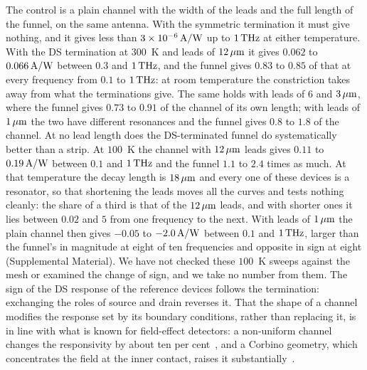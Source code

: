 The control is a plain channel with the width of the leads and the full
length of the funnel, on the same antenna. With the symmetric termination
it must give nothing, and it gives less than $3\times10^{-6}\,\mathrm{A/W}$ up to
$1\,\mathrm{THz}$ at either temperature. With the DS termination at $300$~K and
leads of $12\,\mu\mathrm{m}$ it gives $0.062$ to $0.066\,\mathrm{A/W}$ between $0.3$ and
$1\,\mathrm{THz}$, and the funnel gives $0.83$ to $0.85$ of that at every frequency
from $0.1$ to $1\,\mathrm{THz}$: at room temperature the constriction takes away
from what the terminations give. The same holds with leads of $6$ and
$3\,\mu\mathrm{m}$, where the funnel gives $0.73$ to $0.91$ of the channel of its own
length; with leads of $1\,\mu\mathrm{m}$ the two have different resonances and the
funnel gives $0.8$ to $1.8$ of the channel. At no lead length does the
DS-terminated funnel do systematically better than a strip. At $100$~K
the channel with $12\,\mu\mathrm{m}$ leads gives $0.11$ to $0.19\,\mathrm{A/W}$ between $0.1$
and $1\,\mathrm{THz}$ and the funnel $1.1$ to $2.4$ times as much. At that
temperature the decay length is $18\,\mu\mathrm{m}$ and every one of these devices is
a resonator, so that shortening the leads moves all the curves and tests
nothing cleanly: the share of a third is that of the $12\,\mu\mathrm{m}$ leads, and
with shorter ones it lies between $0.02$ and $5$ from one frequency to
the next. With leads of $1\,\mu\mathrm{m}$ the plain channel then gives $-0.05$ to
$-2.0\,\mathrm{A/W}$ between $0.1$ and $1\,\mathrm{THz}$, larger than the funnel's in magnitude
at eight of ten frequencies and opposite in sign at eight (Supplemental
Material). We have not checked these $100$~K sweeps against the mesh or
examined the change of sign, and we take no number from them. The sign of
the DS response of the reference devices follows the termination:
exchanging the roles of source and drain reverses it. That the shape of
a channel modifies the response set by its boundary conditions, rather
than replacing it, is in line with what is known for field-effect
detectors: a non-uniform channel changes the responsivity by about ten
per cent~\cite{zhang2021terafet}, and a Corbino geometry, which
concentrates the field at the inner contact, raises it
substantially~\cite{khavronin2020singularity}.

